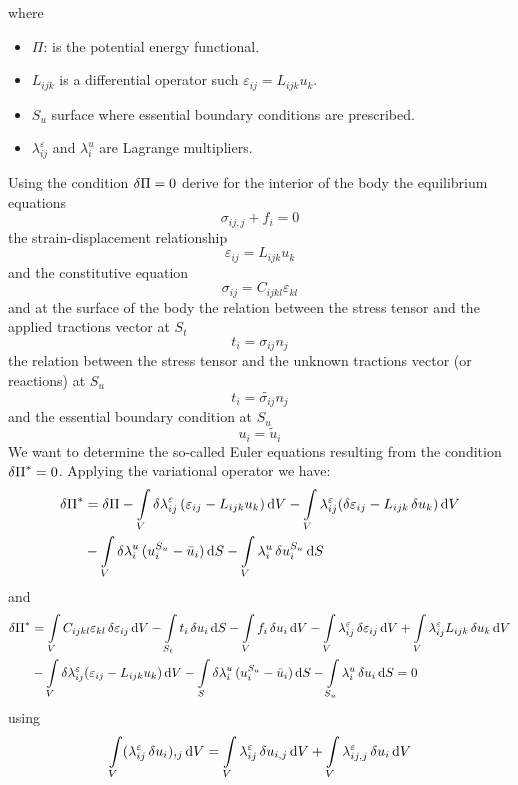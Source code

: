 where
\begin{itemize}
\item $\Pi$: is the potential energy functional.
\item $L_{ijk}$ is a differential operator such $\varepsilon_{ij} = L_{ijk} u_k$.
\item $S_u$ surface where essential boundary conditions are prescribed.
\item $\lambda_{ij}^\varepsilon $ and $\lambda_i^u$ are Lagrange multipliers.
\end{itemize}

Using the condition $\var{\Pi} = 0$ derive for the interior of the body the equilibrium equations
\[\sigma_{ij,j} + f_i = 0\]
the strain-displacement relationship
\[\varepsilon_{ij} = L_{ijk} u_k\]
and the constitutive equation
\[\sigma_{ij} = C_{ijkl} \varepsilon_{kl}\]
and at the surface of the body the relation between the stress tensor and the applied tractions vector at $S_t$
\[t_i = \sigma_{ij} n_j\]
the relation between the stress tensor and the unknown tractions vector (or reactions) at $S_u$
\[t_i = \tilde{\sigma_{ij}} n_j\]
and the essential boundary condition at $S_u$
\[u_i = \tilde{u}_i\]
We want to determine the so-called Euler equations resulting from the condition $\var{\Pi}^* = 0$. Applying the variational operator we have:
\begin{equation}
\begin{aligned}
\var{\Pi}^*& = \var{\Pi}  - \int\limits_V \var{\lambda}_{ij}^{\varepsilon}  (\varepsilon_{ij} - L_{ijk} u_k)\dd{V}- \int\limits_V \lambda_{ij}^\varepsilon (\var{\varepsilon}_{ij} - L_{ijk}\var{u}_k)\dd{V} \\
&-\int\limits_V \var{\lambda}_i^u (u_i^{S_u} - \bar u_i)\dd{S} - \int\limits_V \lambda _i^u \var{u}_i^{S_u} \dd{S}
\end{aligned}
\end{equation}
and
\begin{equation}
\begin{aligned}
\var{\Pi}^* &= \int\limits_V C_{ijkl} \varepsilon_{kl} \var{ \varepsilon}_{ij}\dd{V} - \int\limits_{S_t} t_i \var{u_i} \dd{S}  - \int\limits_V f_i \var{u_i}\dd{V} - \int\limits_V \lambda_{ij}^{\varepsilon} \var{\varepsilon}_{ij}\dd{V}  + \int\limits_V \lambda_{ij}^{\varepsilon} L_{ijk}\var{u_k}\dd{V}\\
&- \int\limits_V \delta \lambda_{ij}^\varepsilon (\varepsilon_{ij} - L_{ijk} u_k)\dd{V} - \int\limits_S \var{\lambda}_i^u (u_i^{S_u} - \bar {u}_i)\dd{S} - \int\limits_{S_u} \lambda _i^u\var{u_i}\dd{S} = 0
\end{aligned}
\end{equation}
using
\[\int\limits_V (\lambda_{ij}^\varepsilon \var{u_i}){,_j}\dd{V} =  \int\limits_V \lambda_{ij}^\varepsilon \var{u}_{i,j}\dd{V}  + \int\limits_V \lambda_{ij,j}^\varepsilon \var{u_i}\dd{V} \]

